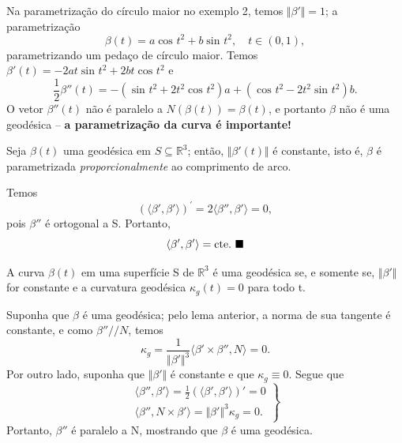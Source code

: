 \documentclass[../differential_geometry.tex]{subfiles}
\begin{document}
\begin{tcolorbox}[
		skin=enhanced,
		title=Observação,
		fonttitle=\bfseries,
		colframe=black,
		colbacktitle=cyan!75!white,
		colback=cyan!15,
		colbacklower=black,
		coltitle=black,
		drop fuzzy shadow,
	]
	Na parametrização do círculo maior no exemplo 2, temos \(\Vert \beta ' \Vert = 1\); a parametrização
	\[
		\beta (t) = a\cos^{}{t^{2}}+b\sin^{}{t^{2}}, \quad t\in (0, 1),
	\]
	parametrizando um pedaço de círculo maior. \linebreak Temos \(\beta '(t) = -2at \sin^{}{t^{2}} + 2bt\cos^{}{t^{2}}\) e
	\[
		\frac{1}{2}\beta ''(t) = - (\sin^{}{t^{2}} + 2t^{2}\cos^{}{t^{2}})a + (\cos^{}{t^{2}}-2t^{2}\sin^{}{t^{2}})b.
	\]
	O vetor \(\beta ''(t)\) não é paralelo a \(N(\beta (t)) = \beta (t)\), e portanto \(\beta \) não é uma geodésica -- \textbf{a parametrização da curva é importante!}
\end{tcolorbox}
\begin{lemma*}
	Seja \(\beta (t)\) uma geodésica em \(S\subseteq \mathbb{R}^{3}\); então, \(\Vert \beta '(t) \Vert\) é constante, isto é, \(\beta \) é parametrizada \textit{proporcionalmente} ao comprimento de arco.
\end{lemma*}
\begin{proof*}
	Temos
	\[
		(\langle \beta ', \beta ' \rangle)^{'}=2\langle \beta '', \beta ' \rangle = 0,
	\]
	pois \(\beta ''\) é ortogonal a S. Portanto,
	\[
		\langle \beta ', \beta ' \rangle = \mathrm{cte}. \text{ $\blacksquare$}
	\]
\end{proof*}
\begin{lemma*}
	A curva \(\beta (t)\) em uma superfície S de \(\mathbb{R}^{3}\) é uma geodésica se, e somente se, \(\Vert \beta ' \Vert\) for constante e a curvatura geodésica \(\kappa_{g}(t) = 0\) para todo t.
\end{lemma*}
\begin{proof*}
	Suponha que \(\beta \) é uma geodésica; pelo lema anterior, a norma de sua tangente é constante, e como \(\beta ''// N\), temos
	\[
		\kappa_{g} = \frac{1}{\Vert \beta ' \Vert^{3}}\langle \beta '\times \beta '', N \rangle = 0.
	\]
	Por outro lado, suponha que \(\Vert \beta ' \Vert\) é constante e que \(\kappa_{g}\equiv 0\). Segue que
	\[
		\left.\begin{array}{ll}
			\langle \beta '', \beta ' \rangle = \frac{1}{2}(\langle \beta ', \beta ' \rangle)'=0 \\
			\langle \beta '', N\times \beta ' \rangle = \Vert \beta ' \Vert^{3} \kappa_{g} = 0.
		\end{array}\right\}
	\]
	Portanto, \(\beta ''\) é paralelo a N, mostrando que \(\beta \) é uma geodésica.
\end{proof*}
\end{document}
